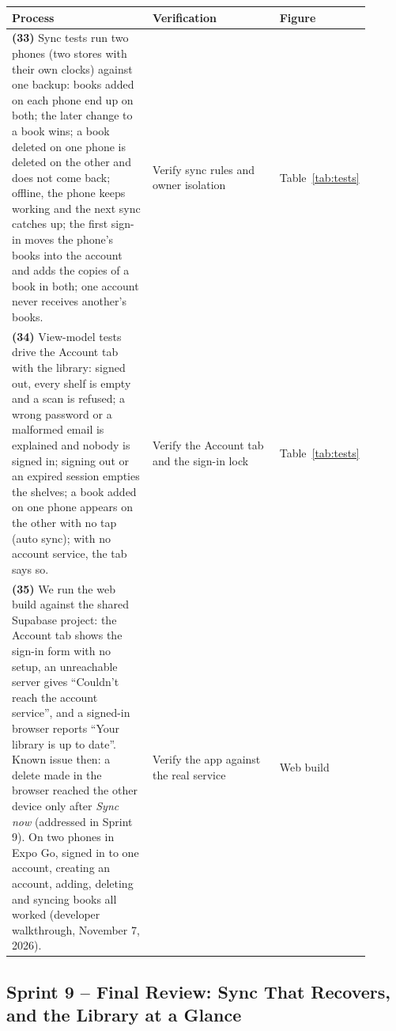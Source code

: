 \documentclass[12pt]{article}
\begin{document}
\begin{longtable}{L{0.4\linewidth} L{0.36\linewidth} L{0.14\linewidth}}
\toprule
\textbf{Process} & \textbf{Verification} & \textbf{Figure} \\
\midrule
\endhead
\textbf{(33)} Sync tests run two phones (two stores with their own clocks) against one backup: books added on each phone end up on both; the later change to a book wins; a book deleted on one phone is deleted on the other and does not come back; offline, the phone keeps working and the next sync catches up; the first sign-in moves the phone's books into the account and adds the copies of a book in both; one account never receives another's books. & Verify sync rules and owner isolation & Table~\ref{tab:tests} \\
\textbf{(34)} View-model tests drive the Account tab with the library: signed out, every shelf is empty and a scan is refused; a wrong password or a malformed email is explained and nobody is signed in; signing out or an expired session empties the shelves; a book added on one phone appears on the other with no tap (auto sync); with no account service, the tab says so. & Verify the Account tab and the sign-in lock & Table~\ref{tab:tests} \\
\textbf{(35)} We run the web build against the shared Supabase project: the Account tab shows the sign-in form with no setup, an unreachable server gives ``Couldn't reach the account service'', and a signed-in browser reports ``Your library is up to date''. Known issue then: a delete made in the browser reached the other device only after \emph{Sync now} (addressed in Sprint 9). On two phones in Expo Go, signed in to one account, creating an account, adding, deleting and syncing books all worked (developer walkthrough, November 7, 2026). & Verify the app against the real service & Web build \\
\bottomrule
\end{longtable}

\subsection{Sprint 9 -- Final Review: Sync That Recovers, and the Library at a Glance}
\label{sec:sprint9}
\end{document}
